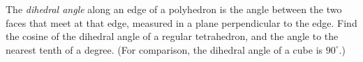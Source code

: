 The \emph{dihedral angle} along an edge of a polyhedron is the angle between the two faces that meet at that edge, measured in a plane perpendicular to the edge. Find the cosine of the dihedral angle of a regular tetrahedron, and the angle to the nearest tenth of a degree. (For comparison, the dihedral angle of a cube is $90^\circ$.)
